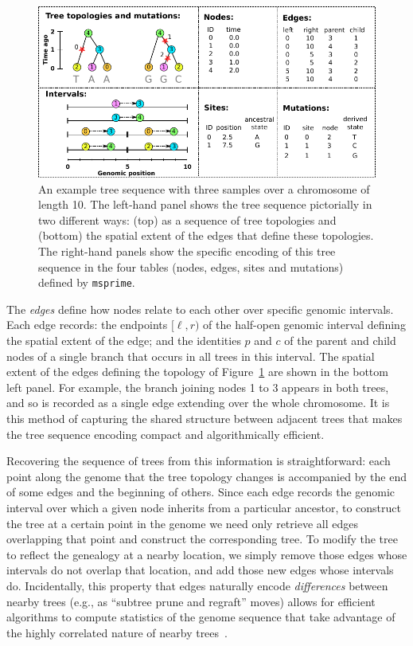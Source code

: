 \documentclass{article}
\newcommand{\msprime}{\texttt{msprime}}
\begin{document}
\begin{figure}
    \begin{center}
        \includegraphics[width=\textwidth]{example_tree_sequence}
    \end{center}
    \caption{
        An example tree sequence with three samples over a chromosome of length 10.
        The left-hand panel shows the tree sequence pictorially in two different ways:
        (top) as a sequence of tree topologies
        and (bottom) the spatial extent of the edges that define these topologies.
        The right-hand panels show the specific encoding
        of this tree sequence in the four tables (nodes, edges, sites and mutations)
        defined by \msprime.
        \label{fig:example_tree_sequence}
    }
\end{figure}

The \emph{edges} define how nodes relate to each other over specific genomic intervals.
Each edge records:
the endpoints $[\ell, r)$ of the half-open genomic interval defining the
spatial extent of the edge;
and the identities $p$ and $c$ of the parent and child nodes
of a single branch that occurs in all trees in this interval.
The spatial extent of the edges defining the topology of Figure~\ref{fig:example_tree_sequence}
are shown in the bottom left panel.
For example, the branch joining nodes 1 to 3 appears in both trees,
and so is recorded as a single edge extending over the whole chromosome.
It is this method of capturing the shared structure between adjacent trees that makes the
tree sequence encoding compact and algorithmically efficient.

Recovering the sequence of trees from this information is straightforward:
each point along the genome that the tree topology changes
is accompanied by the end of some {edges} and the beginning of others.
Since each {edge} records the genomic interval
over which a given node inherits from a particular ancestor,
to construct the tree at a certain point in the genome
we need only retrieve all edges overlapping that point
and construct the corresponding tree.
To modify the tree to reflect the genealogy at a nearby location,
we simply remove those edges whose intervals do not overlap that location,
and add those new edges whose intervals do.
Incidentally, this property that edges naturally encode \emph{differences}
between nearby trees (e.g., as ``subtree prune and regraft'' moves)
allows for efficient algorithms to compute statistics of the genome sequence that take advantage
of the highly correlated nature of nearby trees~\citep{kelleher2016efficient}.
\end{document}
